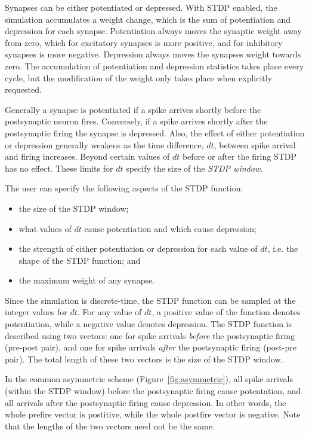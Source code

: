 \documentclass[a4paper]{article}
\begin{document}
Synapses can be either potentiated or depressed.
With STDP enabled,
	the simulation accumulates a weight change, 
	which is the sum of potentiation and depression for each synapse. 
Potentiation always moves the synaptic weight away from zero,
	which for excitatory synapses is more positive,
	and for inhibitory synapses is more negative.
Depression always moves the synapses weight towards zero.
The accumulation of potentiation and depression statistics takes place every cycle,
	but the modification of the weight only takes place when explicitly requested.

Generally a synapse is potentiated if a spike arrives shortly before the
postsynaptic neuron fires. 
Conversely,
	if a spike arrives shortly after the postsynaptic firing the synapse is depressed. 
Also, the effect of either potentiation or depression generally weakens as the time difference, $dt$,
	between spike arrival and firing increases. 
Beyond certain values of $dt$ before or after the firing STDP has no effect. 
These limits for $dt$ specify the size of the \emph{STDP window}.

The user can specify the following aspects of the STDP function:

\begin{itemize}
	\item the size of the STDP window;
	\item what values of $dt$ cause potentiation and which cause depression;
	\item the strength of either potentiation or depression for each value of $dt$, i.e. the shape of the STDP function; and
	\item the maximum weight of any synapse.
\end{itemize}

Since the simulation is discrete-time,
	the STDP function can be sampled at the integer values for $dt$. 
For any value of $dt$, 
	a positive value of the function denotes potentiation, 
	while a negative value denotes depression.
The STDP function is described using two vectors: 
	one for spike arrivals \emph{before} the postsynaptic firing (pre-post pair), and
	one for spike arrivals \emph{after} the postsynaptic firing (post-pre pair).
The total length of these two vectors is the size of the STDP window.

In the common asymmetric scheme (Figure~\ref{fig:asymmetric}), 
	all spike arrivals (within the STDP window) before the postsynaptic firing cause potentation, 
	and all arrivals after the postsynaptic firing cause depression.
In other words, the whole prefire vector is postitive, while the whole postfire vector is negative. 
Note that the lengths of the two vectors need not be the same.
\end{document}

